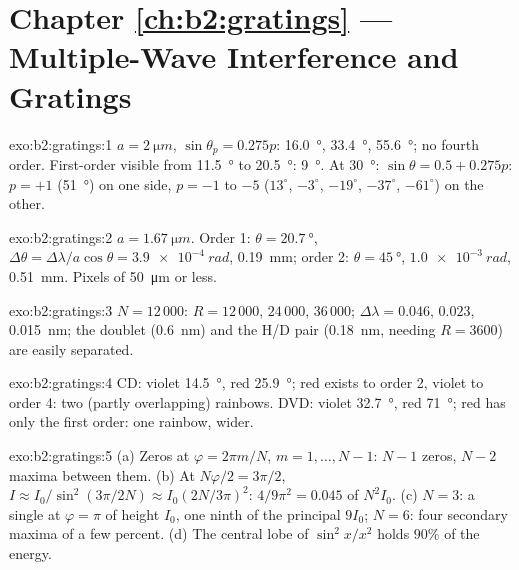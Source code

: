 \section*{Chapter \ref{ch:b2:gratings} --- Multiple-Wave Interference and Gratings}

\begin{solution}{exo:b2:gratings:1}
$a = \qty{2}{\micro m}$, $\sin\theta_p = 0.275p$: \qty{16.0}{\degree}, \qty{33.4}{\degree}, \qty{55.6}{\degree};
no fourth order. First-order visible from \qty{11.5}{\degree} to \qty{20.5}{\degree}:
\qty{9}{\degree}. At \qty{30}{\degree}: $\sin\theta = 0.5 + 0.275p$: $p = +1$ (\qty{51}{\degree}) on one
side, $p = -1$ to $-5$ ($13^\circ$, $-3^\circ$, $-19^\circ$, $-37^\circ$, $-61^\circ$) on the
other.
\end{solution}

\begin{solution}{exo:b2:gratings:2}
$a = \qty{1.67}{\micro m}$. Order 1: $\theta = \qty{20.7}{\degree}$, $\Delta\theta = \Delta\lambda/a\cos\theta =
\qty{3.9e-4}{rad}$, \qty{0.19}{mm}; order 2: $\theta = \qty{45}{\degree}$, $\qty{1.0e-3}{rad}$,
\qty{0.51}{mm}. Pixels of \qty{50}{\micro m} or less.
\end{solution}

\begin{solution}{exo:b2:gratings:3}
$N = 12\,000$: $R = 12\,000$, $24\,000$, $36\,000$; $\Delta\lambda = 0.046$, $0.023$, \qty{0.015}{nm};
the doublet (\qty{0.6}{nm}) and the H/D pair (\qty{0.18}{nm}, needing $R = 3600$)
are easily separated.
\end{solution}

\begin{solution}{exo:b2:gratings:4}
CD: violet \qty{14.5}{\degree}, red \qty{25.9}{\degree}; red exists to order 2, violet to
order 4: two (partly overlapping) rainbows. DVD: violet \qty{32.7}{\degree}, red
\qty{71}{\degree}; red has only the first order: one rainbow, wider.
\end{solution}

\begin{solution}{exo:b2:gratings:5}
(a) Zeros at $\varphi = 2\pi m/N$, $m = 1, \dots, N - 1$: $N - 1$ zeros, $N - 2$ maxima
between them. (b) At $N\varphi/2 = 3\pi/2$, $I \approx I_0/\sin^2(3\pi/2N) \approx I_0(2N/3\pi)^2$:
$4/9\pi^2 = 0.045$ of $N^2I_0$. (c) $N = 3$: a single  at
$\varphi = \pi$ of height $I_0$, one ninth of the principal $9I_0$; $N = 6$: four
secondary maxima of a few percent. (d) The central lobe of $\sin^2x/x^2$
holds $90\%$ of the energy.
\end{solution}

